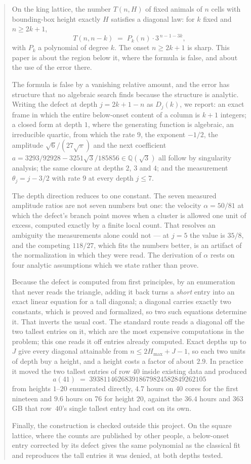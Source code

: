 \documentclass[11pt]{article}
\newcommand{\Q}{\mathbb{Q}}
\newcommand{\Dj}{D_j}
\begin{document}
\begin{abstract}
\noindent
On the king lattice, the number $T(n,H)$ of fixed animals of $n$ cells with
bounding-box height exactly $H$ satisfies a diagonal law: for $k$ fixed and
$n \ge 2k+1$,
\[
  T(n, n-k) \;=\; P_k(n)\cdot 3^{\,n-1-3k},
\]
with $P_k$ a polynomial of degree $k$. The onset $n \ge 2k+1$ is sharp. This
paper is about the region below it, where the formula is false, and about the
use of the error there.

The formula is false by a vanishing relative amount, and the error has
structure that no algebraic search finds because the structure is analytic. Writing the defect at
depth $j = 2k+1-n$ as $\Dj(k)$, we report: an exact frame in which the entire
below-onset content of a column is $k+1$ integers; a closed form at depth $1$,
where the generating function is algebraic, an irreducible quartic, from
which the rate $9$, the exponent $-1/2$, the amplitude $\sqrt6/(27\sqrt\pi)$ and
the next coefficient $a = 3293/92928 - 3251\sqrt3/185856 \in \Q(\sqrt3)$ all
follow by singularity analysis; the same closure at depths $2$, $3$ and $4$; and
the measurement $\theta_j = j - 3/2$ with rate $9$ at every depth $j \le 7$.

The depth direction reduces to one constant. The seven measured amplitude ratios are not
seven numbers but one: the velocity $\alpha = 50/81$ at which the defect's
branch point moves when a cluster is allowed one unit of excess, computed exactly
by a finite local count. That resolves an ambiguity the measurements alone could
not --- at $j = 5$ the value is $35/8$, and the competing $118/27$, which fits
the numbers better, is an artifact of the normalization in which they were read.
The derivation of $\alpha$ rests on four analytic assumptions which we state
rather than prove.

Because the defect is computed from first principles, by an enumeration that
never reads the triangle, adding it back turns a \emph{short} entry into an
exact linear equation for a tall diagonal; a diagonal carries exactly two
constants, which is proved and formalized, so two such equations determine it.
That inverts the usual cost. The standard route reads a diagonal off the two
tallest entries on it, which are the most expensive computations in the
problem; this one reads it off entries already computed. Exact depths up to
$J$ give every diagonal attainable from $n \le 2H_{\max} + J - 1$, so each two
units of depth buy a height, and a height costs a factor of about $2.9$. In
practice it moved the two tallest entries of row $40$ inside existing data and
produced
\[
  a(41) \;=\; 393811462683918679824582849262105
\]
from heights $1$--$20$ enumerated directly, $4.7$ hours on 40 cores for the
first nineteen and $9.6$ hours on 76 for height $20$, against the $36.4$ hours
and $363$\,GB that row~$40$'s single tallest entry had cost on its own.

Finally, the construction is checked outside this project. On the square
lattice, where the counts are published by other people, a below-onset entry
corrected by its defect gives the same polynomial as the classical fit and
reproduces the tall entries it was denied, at both depths tested.
\end{abstract}
\end{document}
